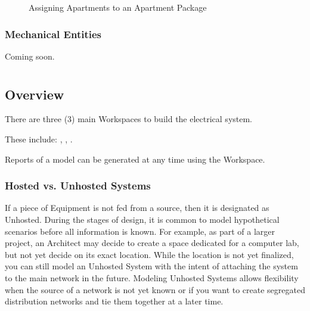 \documentclass[letterpaper,10pt,english]{sphinxmanual}
\begin{document}
\begin{figure}[H]
\centering
\capstart

\noindent{}
\caption{Assigning Apartments to an Apartment Package}\label{\detokenize{docs/userguide/definingarchitecturalelements/archelements/index-arch-elements:id12}}\end{figure}


\subsubsection{Mechanical Entities}
\label{\detokenize{docs/userguide/definingarchitecturalelements/archelements/index-arch-elements:mechanical-entities}}
Coming soon.


\section{}
\label{\detokenize{docs/userguide/index-user_guide:building-the-electrical-model}}\label{\detokenize{docs/userguide/index-user_guide:electrical-workspaces}}

\subsection{Overview}
\label{\detokenize{docs/userguide/index-user_guide:id7}}
There are three (3) main Workspaces to build the electrical system.

These include: {\hyperref[\detokenize{docs/userguide/buildingelectricalmodel/riser/index-riser:riser}]{}}, {\hyperref[\detokenize{docs/userguide/buildingelectricalmodel/one-line/index-one-line:one-line}]{}}, {\hyperref[\detokenize{docs/userguide/buildingelectricalmodel/schedules/index-schedules:schedules}]{}}.

Reports of a model can be generated at any time using the {\hyperref[\detokenize{docs/userguide/buildingelectricalmodel/studies/index-studies:studies}]{}} Workspace.


\subsubsection{Hosted vs. Unhosted Systems}
\label{\detokenize{docs/userguide/index-user_guide:hosted-vs-unhosted-systems}}
If a piece of Equipment is not fed from a source, then it is designated as Unhosted.  During the stages of design, it is common to model hypothetical scenarios before all information is known.  For example, as part of a larger project, an Architect may decide to create a space dedicated for a computer lab, but not yet decide on its exact location.  While the location is not yet finalized, you can still model an Unhosted System with the intent of attaching the system to the main network in the future.  Modeling Unhosted Systems allows flexibility when the source of a network is not yet known or if you want to create segregated distribution networks and tie them together at a later time.
\end{document}
